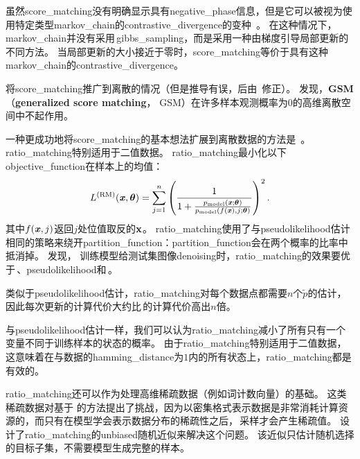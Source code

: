 虽然\gls{score_matching}没有明确显示具有\gls{negative_phase}信息，但是它可以被视为使用特定类型\gls{markov_chain}的\gls{contrastive_divergence}的变种~\citep{Hyvarinen-2007b}。
在这种情况下，\gls{markov_chain}并没有采用\,\gls{gibbs_sampling}，而是采用一种由梯度引导局部更新的不同方法。
当局部更新的大小接近于零时，\gls{score_matching}等价于具有这种\gls{markov_chain}的\gls{contrastive_divergence}。

\cite{Lyu09}将\gls{score_matching}推广到离散的情况（但是推导有误，后由~\cite{Marlin10Inductive-small}修正）。
\cite{Marlin10Inductive-small}发现，\textbf{\gls{GSM}}（\textbf{generalized score matching}， GSM）在许多样本观测概率为$0$的高维离散空间中不起作用。


一种更成功地将\gls{score_matching}的基本想法扩展到离散数据的方法是~\citep{Hyvarinen-2007}。
\gls{ratio_matching}特别适用于二值数据。
\gls{ratio_matching}最小化以下\gls{objective_function}在样本上的均值：
\begin{equation}
	L^{(\text{RM})} (\boldsymbol{\mathit{x}}, \boldsymbol{\theta}) = \sum_{j=1}^n \left( 
	\frac{1}{ 1 + \frac{ p_{\text{model}}(\boldsymbol{\mathit{x}}; \boldsymbol{\theta}) }{ p_{\text{model}}(f(\boldsymbol{\mathit{x}}), j; \boldsymbol{\theta}) } } 
\right)^2.
\end{equation}
其中$f(\boldsymbol{\mathit{x}}, j)$返回$j$处位值取反的$\mathbf{x}$。
\gls{ratio_matching}使用了与\gls{pseudolikelihood}估计相同的策略来绕开\gls{partition_function}：\gls{partition_function}会在两个概率的比率中抵消掉。
\cite{Marlin10Inductive-small}发现，
训练模型给测试集图像\gls{denoising}时，\gls{ratio_matching}的效果要优于\,、\gls{pseudolikelihood}和\,。



类似于\gls{pseudolikelihood}估计，\gls{ratio_matching}对每个数据点都需要$n$个$\tilde{p}$的估计，因此每次更新的计算代价大约比\,的计算代价高出$n$倍。


与\gls{pseudolikelihood}估计一样，我们可以认为\gls{ratio_matching}减小了所有只有一个变量不同于训练样本的状态的概率。
由于\gls{ratio_matching}特别适用于二值数据，这意味着在与数据的\gls{hamming_distance}为$1$内的所有状态上，\gls{ratio_matching}都是有效的。


\gls{ratio_matching}还可以作为处理高维稀疏数据（例如词计数向量）的基础。
这类稀疏数据对基于\,\,的方法提出了挑战，因为以密集格式表示数据是非常消耗计算资源的，而只有在模型学会表示数据分布的稀疏性之后，\,采样才会产生稀疏值。
\cite{Dauphin+Bengio-NIPS2013}设计了\gls{ratio_matching}的\gls{unbiased}随机近似来解决这个问题。
该近似只估计随机选择的目标子集，不需要模型生成完整的样本。


